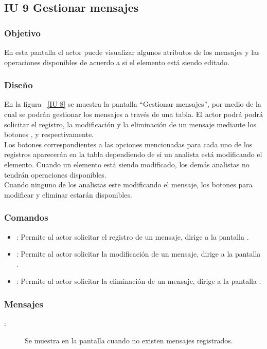 \subsection{IU 9 Gestionar mensajes}
\subsubsection{Objetivo}
	
	En esta pantalla el actor puede visualizar algunos atributos de los mensajes y las operaciones disponibles de acuerdo a si el elemento está siendo editado.

\subsubsection{Diseño}

    En la figura ~\ref{IU 8} se muestra la pantalla ``Gestionar mensajes'', por medio de la cual 
    se podrán gestionar los mensajes a través de una tabla.
    El actor podrá podrá solicitar el registro, la modificación y la eliminación de un mensaje mediante los botones
    , \btnEditar y \btnEliminar respectivamente. \\
    
    Los botones correspondientes a las opciones mencionadas para cada uno de los registros aparecerán en la tabla dependiendo de si 
    un analista está modificando el elemento. Cuando un elemento está siendo modificado, los demás analistas no tendrán operaciones disponibles.\\
   
    Cuando ninguno de los analistas este modificando el mensaje, los botones para modificar y eliminar estarán disponibles.
    


\subsubsection{Comandos}
\begin{itemize}
	\item {}: Permite al actor solicitar el registro de un mensaje, dirige a la pantalla .
	\item \btnEditar[Modificar]: Permite al actor solicitar la modificación de un mensaje, dirige a la pantalla .
	\item \btnEliminar[Eliminar]: Permite al actor solicitar la eliminación de un mensaje, dirige a la pantalla .
\end{itemize}

\subsubsection{Mensajes}

	
\begin{description}
	\item[:] Se muestra en la pantalla  cuando no existen mensajes registrados.
\end{description}
